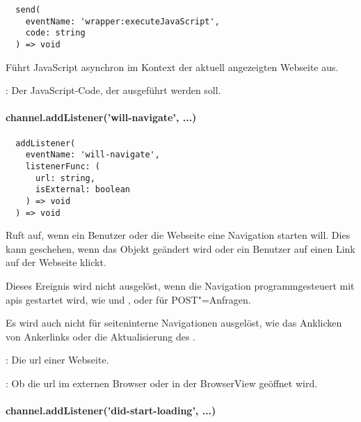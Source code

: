 \begin{verbatim}
  send(
    eventName: 'wrapper:executeJavaScript',
    code: string
  ) => void
\end{verbatim}

Führt JavaScript asynchron im Kontext der aktuell angezeigten Webseite aus.

\begin{arguments}
  \item {}: Der JavaScript-Code, der ausgeführt werden soll.
\end{arguments}


\paragraph{channel.addListener('will-navigate', ...)}

\begin{verbatim}
  addListener(
    eventName: 'will-navigate',
    listenerFunc: (
      url: string,
      isExternal: boolean
    ) => void
  ) => void
\end{verbatim}

Ruft  auf, wenn ein Benutzer oder die Webseite eine Navigation starten will.
Dies kann geschehen, wenn das Objekt  geändert wird oder ein Benutzer auf einen Link auf der Webseite klickt.

Dieses Ereignis wird nicht ausgelöst, wenn die Navigation programmgesteuert mit \acsp{api} gestartet wird, wie  und , oder für POST"=Anfragen.

Es wird auch nicht für seiteninterne Navigationen ausgelöst, wie das Anklicken von Ankerlinks oder die Aktualisierung des .

\begin{arguments}
  \item {}: Die \ac{url} einer Webseite.
  \item {}: Ob die \ac{url} im externen Browser oder in der BrowserView geöffnet wird.
\end{arguments}


\newpage

\paragraph{channel.addListener('did-start-loading', ...)}

